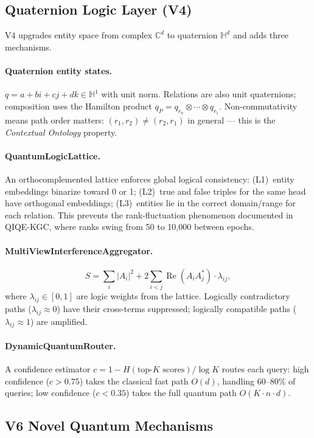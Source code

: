 \documentclass[runningheads]{llncs}
\newcommand{\CC}{\mathbb{C}}
\newcommand{\HH}{\mathbb{H}}
\begin{document}
\subsection{Quaternion Logic Layer (V4)}
\label{sec:v4}

V4 upgrades entity space from complex $\CC^d$ to quaternion $\HH^d$ and
adds three mechanisms.

\paragraph{Quaternion entity states.}
$q=a+bi+cj+dk\in\HH^1$ with unit norm.  Relations are also unit quaternions;
composition uses the Hamilton product $q_{P}=q_{r_n}\otimes\cdots\otimes q_{r_1}$.
Non-commutativity means path order matters: $(r_1,r_2)\neq(r_2,r_1)$ in
general --- this is the \emph{Contextual Ontology} property.

\paragraph{QuantumLogicLattice.}
An orthocomplemented lattice enforces global logical consistency:
(L1)~entity embeddings binarize toward 0 or 1;
(L2)~true and false triples for the same head have orthogonal embeddings;
(L3)~entities lie in the correct domain/range for each relation.
This prevents the rank-fluctuation phenomenon documented in QIQE-KGC, where
ranks swing from 50 to 10,000 between epochs.

\paragraph{MultiViewInterferenceAggregator.}
\[
  S = \sum_i|A_i|^2 + 2\sum_{i<j}\operatorname{Re}(A_iA_j^*)\cdot\lambda_{ij},
\]
where $\lambda_{ij}\in[0,1]$ are logic weights from the lattice.
Logically contradictory paths ($\lambda_{ij}\approx 0$) have their
cross-terms suppressed; logically compatible paths ($\lambda_{ij}\approx 1$)
are amplified.

\paragraph{DynamicQuantumRouter.}
A confidence estimator $c=1-H(\text{top-}K\text{ scores})/\log K$ routes
each query: high confidence ($c>0.75$) takes the classical fast path $O(d)$,
handling 60--80\% of queries; low confidence ($c<0.35$) takes the full
quantum path $O(K\cdot n\cdot d)$.

\subsection{V6 Novel Quantum Mechanisms}
\label{sec:v6}
\end{document}
